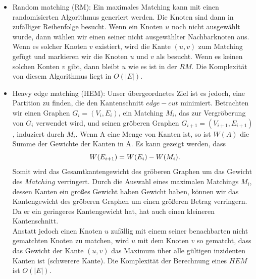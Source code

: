 \documentclass[runningheads]{llncs}
\begin{document}
\begin{itemize}
	\item Random matching (RM): Ein maximales Matching kann mit einen randomisierten Algorithmus generiert werden. Die Knoten sind dann in  zufälliger Reihenfolge besucht. Wenn ein Knoten $u$ noch nicht ausgewählt wurde, dann wählen wir einen seiner nicht ausgewählter Nachbarknoten aus. Wenn es solcher Knoten $v$ existiert, wird die Kante $(u, v)$ zum Matching gefügt und markieren wir die Knoten $u$ und $v$ als besucht. Wenn es keinen solchen Konten $v$ gibt, dann bleibt $u$  wie es ist in der $RM$. Die Komplexität von diesem Algorithmus liegt in $O(\lvert E \lvert)$.
	\item Heavy edge matching (HEM): Unser übergeordnetes Ziel ist es jedoch, eine Partition zu finden, die den Kantenschnitt $edge-cut$ minimiert.
	Betrachten wir
	einen Graphen $G_i = (V_i, E_i)$, ein Matching $M_i$, das zur Vergröberung von $G_i$ verwendet wird, und seinen gröberen Graphen
	$G_{i+1} = (V_{i+1}, E_{i+1})$, induziert durch $M_i$. Wenn A eine Menge von Kanten ist, so ist $W(A)$ die Summe
	der Gewichte der Kanten in A. Es kann gezeigt werden, dass
	\begin{equation} 
		\centerline{$W(E_{i+1}) = W(E_i) - W(M_i).$}
	\end{equation}
	Somit wird das Gesamtkantengewicht des gröberen Graphen um das Gewicht des $Matching$ verringert. Durch die Auswahl eines maximalen Matchings $M_i$, dessen Kanten ein großes Gewicht haben
	Gewicht haben, können wir das Kantengewicht des gröberen Graphen um einen größeren Betrag verringern. Da er ein geringeres Kantengewicht hat, hat auch einen kleineren Kantenschnitt. \\
	 Anstatt jedoch einen Knoten $u$ zufällig mit einem seiner benachbarten nicht gematchten Knoten zu matchen, wird $u$ mit dem Knoten $v$ so gematcht, dass das Gewicht der Kante $(u, v)$ das Maximum über alle gültigen inzidenten Kanten ist (schwerere Kante). Die Komplexität der Berechnung eines $HEM$ ist $O(\lvert E \lvert)$.
\end{itemize}
\end{document}
